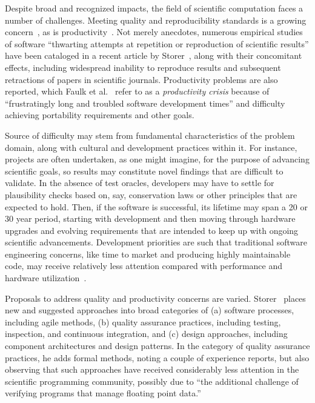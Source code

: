 \documentclass[../../proposal.tex]{subfiles}
\begin{document}
Despite broad and recognized impacts, the field of scientific computation faces a number of challenges.  Meeting quality and reproducibility standards is a growing concern~\cite{}, as is productivity~\cite{}.  Not merely anecdotes, numerous empirical studies of software ``thwarting attempts at repetition or reproduction of scientific results'' have been cataloged in a recent article by Storer~\cite{}, along with their concomitant effects, including widespread inability to reproduce results and subsequent retractions of papers in scientific journals.  Productivity problems are also reported, which Faulk et al.~\cite{} refer to as a \emph{productivity crisis} because of ``frustratingly long and troubled software development times'' and difficulty achieving portability requirements and other goals.

Source of difficulty may stem from fundamental characteristics of the problem domain, along with cultural and development practices within it.  For instance, projects are often undertaken, as one might imagine, for the purpose of advancing scientific goals, so results may constitute novel findings that are difficult to validate.  In the absence of test oracles, developers may have to settle for plausibility checks based on, say, conservation laws or other principles that are expected to hold.  Then, if the software is successful, its lifetime may span a 20 or 30 year period, starting with development and then moving through hardware upgrades and evolving requirements that are intended to keep up with ongoing scientific advancements.  Development priorities are such that traditional software engineering concerns, like time to market and producing highly maintainable code, may receive relatively less attention compared with performance and hardware utilization~\cite{}.

Proposals to address quality and productivity concerns are varied.  Storer~\cite{} places new and suggested approaches into broad categories of (a) software processes, including agile methods, (b) quality assurance practices, including testing, inspection, and continuous integration, and (c) design approaches, including component architectures and design patterns.  In the category of quality assurance practices, he adds formal methods, noting a couple of experience reports, but also observing that such approaches have received considerably less attention in the scientific programming community, possibly due to ``the additional challenge of verifying programs that manage floating point data.''
\end{document}
